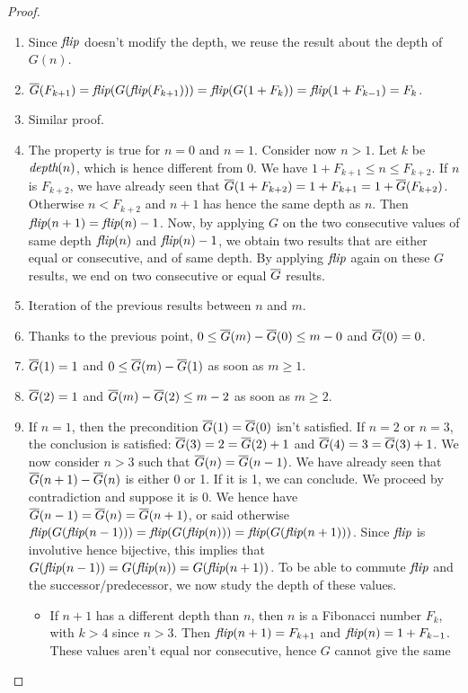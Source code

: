 \documentclass[a4paper,11pt]{article}
\begin{document}
\begin{proof}
\noindent
\begin{enumerate}
\item Since $\textit{flip}$ doesn't modify the depth, we reuse the
result about the depth of $G(n)$.
\item $\overline{G}(F_{k+1}) = \textit{flip}(G(\textit{flip}(F_{k+1}))) = \textit{flip}(G(1+F_k)) =
       \textit{flip}(1+F_{k-1}) = F_k$.
\item Similar proof.
\item The property is true for $n=0$ and $n=1$.
Consider now $n>1$. Let $k$ be $\textit{depth}(n)$, which is
hence different from 0. We have $1+F_{k+1} \le n \le F_{k+2}$.
If $n$ is $F_{k+2}$, we have already seen that
$\overline{G}(1+F_{k+2}) = 1+F_{k+1} = 1+\overline{G}(F_{k+2})$. Otherwise $n < F_{k+2}$
and $n+1$ has hence the same depth as $n$. Then
$\textit{flip}(n+1)=\textit{flip}(n)-1$. Now, by applying $G$ on the two consecutive values
of same depth $\textit{flip}(n)$ and $\textit{flip}(n)-1$, we obtain two results that
are either equal or consecutive, and of same depth. By applying $\textit{flip}$
again on these $G$ results, we end on two consecutive or equal
$\overline{G}$ results.
\item Iteration of the previous results between $n$ and $m$.
\item Thanks to the previous point, $0 \le \overline{G}(m)-\overline{G}(0) \le m-0$
and $\overline{G}(0)=0$.
\item $\overline{G}(1)=1$ and $0 \le \overline{G}(m)-\overline{G}(1)$ as soon as $m\ge 1$.
\item $\overline{G}(2)=1$ and $\overline{G}(m)-\overline{G}(2) \le m-2$ as soon as $m \ge 2$.
\item If $n=1$, then the precondition $\overline{G}(1)=\overline{G}(0)$ isn't
  satisfied. If $n=2$ or $n=3$, the conclusion is satisfied:
  $\overline{G}(3)=2=\overline{G}(2)+1$ and $\overline{G}(4)=3=\overline{G}(3)+1$.
  We now consider $n>3$ such that
  $\overline{G}(n)=\overline{G}(n-1)$. We have already seen that $\overline{G}(n+1)-\overline{G}(n)$
  is either 0 or 1. If it is 1, we can conclude. We proceed by
  contradiction and suppose it is 0. We hence have
  $\overline{G}(n-1)=\overline{G}(n)=\overline{G}(n+1)$, or said otherwise
  $\textit{flip}(G(\textit{flip}(n-1))) = \textit{flip}(G(\textit{flip}(n))) = \textit{flip}(G(\textit{flip}(n+1)))$.
  Since $\textit{flip}$ is involutive hence bijective, this implies that
  $G(\textit{flip}(n-1))=G(\textit{flip}(n))=G(\textit{flip}(n+1))$. To be able to commute
  $\textit{flip}$ and the successor/predecessor, we now study the depth
  of these values.
  \begin{itemize}
  \item If $n+1$ has a different depth than $n$, then
    $n$ is a Fibonacci number $F_{k}$, with $k>4$ since $n>3$.
    Then $\textit{flip}(n+1)=F_{k+1}$ and $\textit{flip}(n)=1+F_{k-1}$. These values
    aren't equal nor consecutive, hence $G$ cannot give the same

\end{itemize}
\end{enumerate}
\end{proof}
\end{document}
